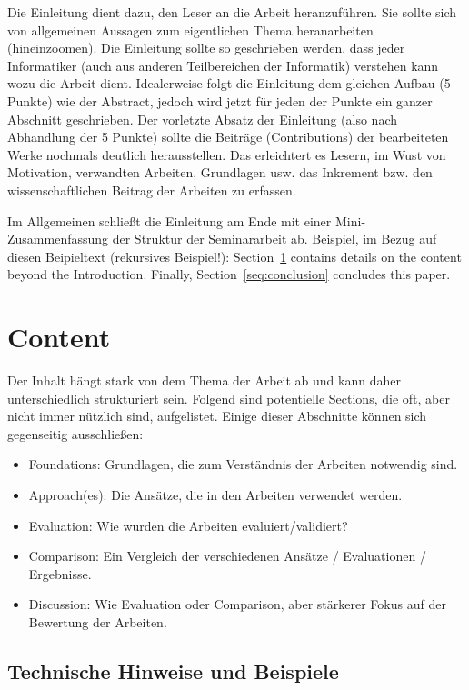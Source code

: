 \documentclass[runningheads,a4paper]{uwsese}
\begin{document}
 Die Einleitung dient dazu, den Leser an die Arbeit heranzuführen. Sie sollte sich von allgemeinen Aussagen zum eigentlichen Thema heranarbeiten (hineinzoomen). Die Einleitung sollte so geschrieben werden, dass jeder Informatiker (auch aus anderen Teilbereichen der Informatik) verstehen kann wozu die Arbeit dient. Idealerweise folgt die Einleitung dem gleichen Aufbau (5 Punkte) wie der Abstract, jedoch wird jetzt für jeden der Punkte ein ganzer Abschnitt geschrieben. Der vorletzte Absatz der Einleitung (also nach Abhandlung der 5 Punkte) sollte die Beiträge (Contributions) der bearbeiteten Werke nochmals deutlich herausstellen. Das erleichtert es Lesern, im Wust von Motivation, verwandten Arbeiten, Grundlagen usw. das Inkrement bzw. den wissenschaftlichen Beitrag der Arbeiten zu erfassen.

Im Allgemeinen schließt die Einleitung am Ende mit einer Mini-Zusammen\-fassung der Struktur der Seminararbeit ab. Beispiel, im Bezug auf diesen Beipieltext (rekursives Beispiel!): Section~\ref{seq:content} contains details on the content beyond the Introduction. Finally, Section~\ref{seq:conclusion} concludes this paper.

\section{Content}
\label{seq:content}

Der Inhalt hängt stark von dem Thema der Arbeit ab und kann daher unterschiedlich strukturiert sein. Folgend sind potentielle Sections, die oft, aber nicht immer nützlich sind, aufgelistet. Einige dieser Abschnitte können sich gegenseitig ausschließen:
\begin{itemize}
	\item Foundations: Grundlagen, die zum Verständnis der Arbeiten notwendig sind.
	\item Approach(es): Die Ansätze, die in den Arbeiten verwendet werden.
	\item Evaluation: Wie wurden die Arbeiten evaluiert/validiert?
	\item Comparison: Ein Vergleich der verschiedenen Ansätze / Evaluationen / Ergebnisse.
	\item Discussion: Wie Evaluation oder Comparison, aber stärkerer Fokus auf der Bewertung der Arbeiten.
\end{itemize}

\subsection{Technische Hinweise und Beispiele}
\end{document}
